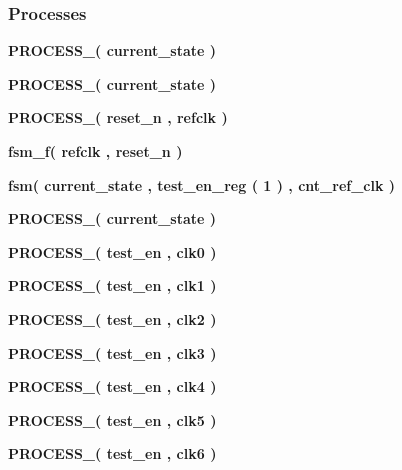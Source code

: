 \subsubsection*{Processes}
 \begin{DoxyCompactItemize}
\item 
{\bf P\+R\+O\+C\+E\+S\+S\+\_}{\bfseries  ( {\bfseries {\bfseries {\bf current\+\_\+state}} \textcolor{vhdlchar}{ }} )}
\item 
{\bf P\+R\+O\+C\+E\+S\+S\+\_}{\bfseries  ( {\bfseries {\bfseries {\bf current\+\_\+state}} \textcolor{vhdlchar}{ }} )}
\item 
{\bf P\+R\+O\+C\+E\+S\+S\+\_}{\bfseries  ( {\bfseries {\bfseries {\bf reset\+\_\+n}} \textcolor{vhdlchar}{ }} , {\bfseries {\bfseries {\bf refclk}} \textcolor{vhdlchar}{ }} )}
\item 
{\bf fsm\+\_\+f}{\bfseries  ( {\bfseries {\bfseries {\bf refclk}} \textcolor{vhdlchar}{ }} , {\bfseries {\bfseries {\bf reset\+\_\+n}} \textcolor{vhdlchar}{ }} )}
\item 
{\bf fsm}{\bfseries  ( {\bfseries {\bfseries {\bf current\+\_\+state}} \textcolor{vhdlchar}{ }} , {\bfseries {\bfseries {\bf test\+\_\+en\+\_\+reg}} \textcolor{vhdlchar}{(}\textcolor{vhdlchar}{ } \textcolor{vhdldigit}{1} \textcolor{vhdlchar}{)}\textcolor{vhdlchar}{ }} , {\bfseries {\bfseries {\bf cnt\+\_\+ref\+\_\+clk}} \textcolor{vhdlchar}{ }} )}
\item 
{\bf P\+R\+O\+C\+E\+S\+S\+\_}{\bfseries  ( {\bfseries {\bfseries {\bf current\+\_\+state}} \textcolor{vhdlchar}{ }} )}
\item 
{\bf P\+R\+O\+C\+E\+S\+S\+\_}{\bfseries  ( {\bfseries {\bfseries {\bf test\+\_\+en}} \textcolor{vhdlchar}{ }} , {\bfseries {\bfseries {\bf clk0}} \textcolor{vhdlchar}{ }} )}
\item 
{\bf P\+R\+O\+C\+E\+S\+S\+\_}{\bfseries  ( {\bfseries {\bfseries {\bf test\+\_\+en}} \textcolor{vhdlchar}{ }} , {\bfseries {\bfseries {\bf clk1}} \textcolor{vhdlchar}{ }} )}
\item 
{\bf P\+R\+O\+C\+E\+S\+S\+\_}{\bfseries  ( {\bfseries {\bfseries {\bf test\+\_\+en}} \textcolor{vhdlchar}{ }} , {\bfseries {\bfseries {\bf clk2}} \textcolor{vhdlchar}{ }} )}
\item 
{\bf P\+R\+O\+C\+E\+S\+S\+\_}{\bfseries  ( {\bfseries {\bfseries {\bf test\+\_\+en}} \textcolor{vhdlchar}{ }} , {\bfseries {\bfseries {\bf clk3}} \textcolor{vhdlchar}{ }} )}
\item 
{\bf P\+R\+O\+C\+E\+S\+S\+\_}{\bfseries  ( {\bfseries {\bfseries {\bf test\+\_\+en}} \textcolor{vhdlchar}{ }} , {\bfseries {\bfseries {\bf clk4}} \textcolor{vhdlchar}{ }} )}
\item 
{\bf P\+R\+O\+C\+E\+S\+S\+\_}{\bfseries  ( {\bfseries {\bfseries {\bf test\+\_\+en}} \textcolor{vhdlchar}{ }} , {\bfseries {\bfseries {\bf clk5}} \textcolor{vhdlchar}{ }} )}
\item 
{\bf P\+R\+O\+C\+E\+S\+S\+\_}{\bfseries  ( {\bfseries {\bfseries {\bf test\+\_\+en}} \textcolor{vhdlchar}{ }} , {\bfseries {\bfseries {\bf clk6}} \textcolor{vhdlchar}{ }} )}
\end{DoxyCompactItemize}
